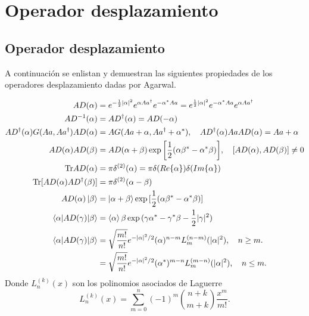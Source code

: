 \chapter{Operador desplazamiento}
\section{Operador desplazamiento}

A continuación se enlistan y demuestran las siguientes propiedades de los operadores desplazamiento dadas por Agarwal.

\begin{align}
A{D}(\alpha)                                                 & = e^{-\frac{1}{2}|\alpha|^2} e^{\alpha A{a}^\dagger} e^{-\alpha^* A{a}}  = e^{\frac{1}{2}|\alpha|^2} e^{-\alpha^* A{a}} e^{\alpha A{a}^\dagger} \\
A{D}^{-1}(\alpha)                                            & = A{D}^\dagger (\alpha) = A{D}(-\alpha)                                                                                                               \\
A{D}^\dagger(\alpha) G(A{a}, A{a}^\dagger) A{D}(\alpha) & = A{G}(A{a} + \alpha, A{a}^\dagger + \alpha^*), \quad A{D}^\dagger(\alpha)A{a}A{D}(\alpha) = A{a}+\alpha                               \\
A{D}(\alpha)A{D}(\beta)                                   & = A{D}(\alpha + \beta) \exp{\left[ \frac{1}{2}(\alpha\beta^* - \alpha^*\beta) \right]}, \quad [A{D}(\alpha), A{D}(\beta)]\neq 0                    \\
\mathrm{Tr}A{D}(\alpha)                                      & = \pi \delta^{(2)}(\alpha) = \pi\delta(Re\{\alpha\})\delta(Im\{\alpha\})                     \\
\mathrm{Tr}[A{D}(\alpha)A{D}^\dagger(\beta)]              & = \pi \delta^{(2)}(\alpha-\beta)                                                                                                                            \\
A{D}(\alpha)\ket{\beta}                                      & = \ket{\alpha + \beta} \exp{[\frac{1}{2}(\alpha\beta^* - \alpha^*\beta)]}                                                \\
\langle \alpha \vert A{D}(\gamma) \vert \beta\rangle                       & = \braket{\alpha}{\beta}\exp{(\gamma\alpha^* - \gamma^*\beta - \frac{1}{2}|\gamma|^2)}                                         \\
\langle \alpha \vert A{D}(\gamma) \vert \beta\rangle & = \sqrt{\frac{m!}{n!}}e^{-|\alpha|^2/2}(\alpha)^{n-m}L_m^{(n-m)}(|\alpha|^2),\quad n\geq m.                                                                 \\
& = \sqrt{\frac{m!}{n!}}e^{-|\alpha|^2/2}(\alpha^*)^{m-n}L_m^{(m-n)}(|\alpha|^2), \quad n\leq m.
\end{align}
Donde $L_n^{(k)}(x)$ son los polinomios asociados de Laguerre
\begin{equation*}
  L_n^{(k)}(x) = \sum_{m=0}^{n} (-1)^m\binom{n+k}{m+k}\frac{x^m}{m!}.
\end{equation*}

